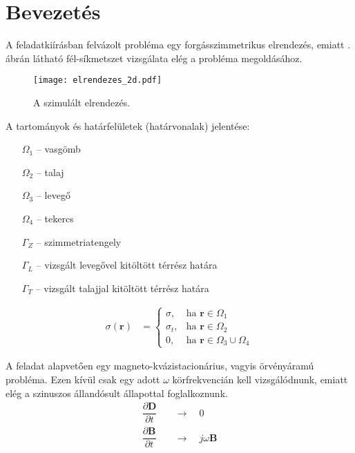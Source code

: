 \section{Bevezetés}
    A feladatkiírásban felvázolt probléma egy forgásszimmetrikus elrendezés, emiatt . ábrán látható fél-síkmetszet vizsgálata elég a probléma megoldásához.\\[1ex]

    \begin{wrapfigure}{L}{0.35\textwidth}
        \centering
        \texttt{[image: elrendezes\_2d.pdf]}
        \caption{A szimulált elrendezés.}
        \label{fig:elrendezes_2d}
    \end{wrapfigure}

 A tartományok és határfelületek (határvonalak) jelentése:
    \begin{itemize}
        \item[$\Omega_1$] -- vasgömb
        \item[$\Omega_2$] -- talaj
        \item[$\Omega_3$] -- levegő
        \item[$\Omega_4$] -- tekercs
        \item[$\Gamma_Z$] -- szimmetriatengely
        \item[$\Gamma_L$] -- vizsgált levegővel kitöltött térrész határa
        \item[$\Gamma_T$] -- vizsgált talajjal kitöltött térrész határa
    \end{itemize}

    \begin{align}
        \sigma(\mathbf{r}) &=
            \begin{cases}
                \sigma, & \text{ha } \mathbf{r} \in \Omega_1\\
                \sigma_t, & \text{ha } \mathbf{r} \in \Omega_2\\
                0, & \text{ha } \mathbf{r} \in \Omega_3 \cup \Omega_4
            \end{cases}
    \end{align}

    A feladat alapvetően egy magneto-kvázistacionárius, vagyis örvényáramú probléma. Ezen kívül csak egy adott $\omega$ körfrekvencián kell vizsgálódnunk, emiatt elég a szinuszos állandósult állapottal foglalkoznunk.
    \begin{align}
        \dfrac{\partial \mathbf{D}}{\partial t} \quad&\longrightarrow\quad 0\\
        \dfrac{\partial \mathbf{B}}{\partial t} \quad&\longrightarrow\quad j\omega\mathbf{B}
    \end{align}

